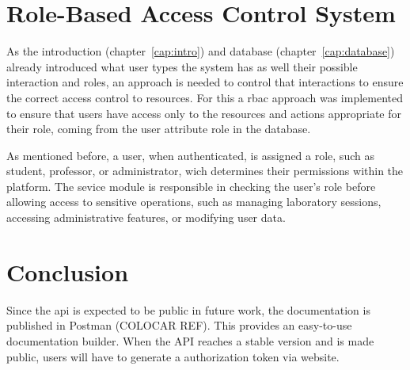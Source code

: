 \section{Role-Based Access Control System}
As the introduction (chapter~\ref{cap:intro}) and database (chapter~\ref{cap:database}) already introduced what user types the system has as well their possible interaction and roles, an approach is needed to control that interactions to ensure the correct access control to resources. For this a \acf{rbac} approach was implemented to ensure that users have access only to the resources and actions appropriate for their role, coming from the user attribute role in the database. 

As mentioned before, a user, when authenticated, is assigned a role, such as student, professor, or administrator, wich determines their permissions within the platform. The sevice module is responsible in checking the user's role before allowing access to sensitive operations, such as managing laboratory sessions, accessing administrative features, or modifying user data. 

\section{Conclusion}

Since the \acs{api} is expected to be public in future work, the documentation is published in Postman (COLOCAR REF). This provides an easy-to-use documentation builder. When the API reaches a stable version and is made public, users will have to generate a authorization token via website. 